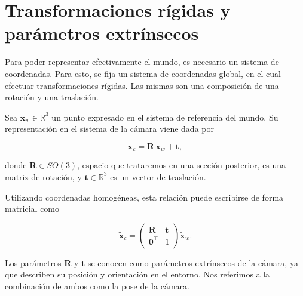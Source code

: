 \section{Transformaciones rígidas y parámetros extrínsecos}
Para poder representar efectivamente el mundo, es necesario un sistema de coordenadas. Para esto, se fija un sistema de coordenadas global, en el cual efectuar transformaciones rígidas. Las mismas son una composición de una rotación y una traslación.

Sea $\mathbf{x}_w \in \mathbb{R}^3$ un punto expresado en el sistema de referencia del mundo.
Su representación en el sistema de la cámara viene dada por

\begin{equation}
\mathbf{x}_c = \mathbf{R}\,\mathbf{x}_w + \mathbf{t},
\end{equation}

\noindent donde $\mathbf{R} \in SO(3)$, espacio que trataremos en una sección posterior, es una matriz de rotación, y $\mathbf{t} \in \mathbb{R}^3$ es
un vector de traslación.

Utilizando coordenadas homogéneas, esta relación puede escribirse de forma matricial como

\begin{equation}
\tilde{\mathbf{x}}_c =
\begin{pmatrix}
\mathbf{R} & \mathbf{t} \\
\mathbf{0}^\top & 1
\end{pmatrix}
\tilde{\mathbf{x}}_w.
\end{equation}

Los parámetros $\mathbf{R}$ y $\mathbf{t}$ se conocen como parámetros extrínsecos de la cámara,
ya que describen su posición y orientación en el entorno. Nos referimos a la combinación de ambos como la pose de la cámara.